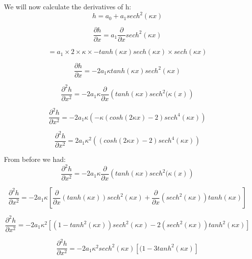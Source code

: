 \documentclass[12pt]{article}
\begin{document}
We will now calculate the derivatives of h:
\[h = a_0 + a_1 sech^2\left(\kappa x\right)\]

\[\frac{\partial h}{\partial x} =  a_1 \frac{\partial }{\partial x}  sech^2\left(\kappa x \right)\]

\[ = a_1 \times 2 \times \kappa \times - tanh(\kappa x)sech(\kappa x) \times sech(\kappa x)\]

\[ \frac{\partial h}{\partial x} = - 2a_1\kappa tanh(\kappa x )sech^2(\kappa x )\]

\[ \frac{\partial^2 h}{\partial x^2} = - 2a_1\kappa \frac{\partial}{\partial x} \left(tanh(\kappa x)sech^2(\kappa(x )\right)\]

\[ \frac{\partial^2 h}{\partial x^2} = - 2a_1\kappa \left(-\kappa \left(cosh(2 \kappa x) - 2\right)sech^4(\kappa x)\right)\]

\[ \frac{\partial^2 h}{\partial x^2} = 2a_1\kappa^2 \left(\left(cosh(2 \kappa x) - 2\right)sech^4(\kappa x)\right)\]

From before we had:
\[ \frac{\partial^2 h}{\partial x^2} = - 2a_1\kappa \frac{\partial}{\partial x} \left(tanh(\kappa x)sech^2(\kappa(x )\right)\]

\[ \frac{\partial^2 h}{\partial x^2} = - 2a_1\kappa \left[ \frac{\partial}{\partial x}\left(tanh(\kappa x )\right)sech^2( \kappa x)  + \frac{\partial}{\partial x}\left(sech^2(\kappa x)\right)tanh(\kappa x ) \right] \]


\[ \frac{\partial^2 h}{\partial x^2} = - 2a_1\kappa^2 \left[ \left( 1-tanh^2(\kappa x )\right)sech^2( \kappa x)  -2 \left(sech^2(\kappa x)\right)tanh^2(\kappa x ) \right] \]

\[ \frac{\partial^2 h}{\partial x^2} = - 2a_1\kappa^2 sech^2( \kappa x) \left[ ( 1-3tanh^2(\kappa x ) \right] \]
\end{document}
